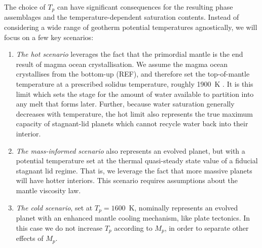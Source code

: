 \documentclass[linenumbers]{aastex631}
\renewcommand{\ol}{Mg$_2$SiO$_4$}
\begin{document}
The choice of $T_p$ can have significant consequences for the resulting phase assemblages and the temperature-dependent saturation contents. Instead of considering a wide range of geotherm potential temperatures agnostically, we will focus on a few key scenarios:

\begin{enumerate} 
\item \textit{The hot scenario} leverages the fact that the primordial mantle is the end result of magma ocean crystallisation. We assume the magma ocean crystallises from the bottom-up (REF), and therefore set the top-of-mantle temperature at a prescribed solidus temperature, roughly 1900~K \citep{stixrude_melting_2014, noack_parameterisations_2020}. It is this limit which sets the stage for the amount of water available to partition into any melt that forms later. Further, because water saturation generally decreases with temperature, the hot limit also represents the true maximum capacity of stagnant-lid planets which cannot recycle water back into their interior.%

\item \textit{The mass-informed scenario} also represents an evolved planet, but with a potential temperature set at the thermal quasi-steady state value of a fiducial stagnant lid regime. That is, we leverage the fact that more massive planets will have hotter interiors. This scenario requires assumptions about the mantle viscosity law.

\item \textit{The cold scenario}, set at $T_p = 1600$~K, nominally represents an evolved planet with an enhanced mantle cooling mechanism, like plate tectonics. In this case we do not increase $T_p$ according to $M_p$, in order to separate other effects of $M_p$.
\end{enumerate}



\end{document}
